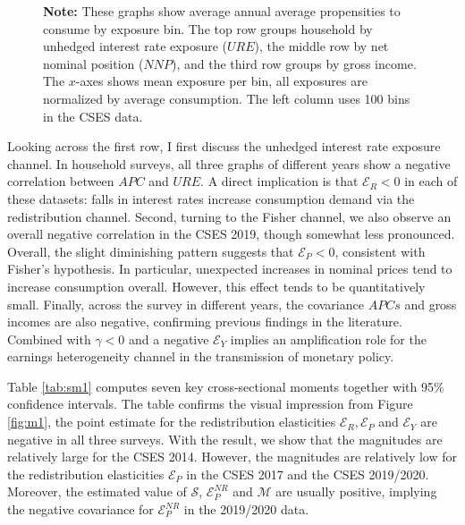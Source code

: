 \documentclass[11pt,letterpaper]{article}
\begin{document}
\begin{figure}
\begin{subfigure}[b]{0.33\linewidth}
	\newline {}
\end{subfigure}
\begin{tablenotes}
	\footnotesize
	\item \textbf{Note:} These graphs show average annual average propensities to consume by exposure bin. The top row groups household by unhedged interest rate exposure ($URE$), the middle row by net nominal position ($NNP$), and the third row groups by gross income. The $x$-axes shows mean exposure per bin, all exposures are normalized by average consumption. The left column uses 100 bins in the CSES data.    
\end{tablenotes} 


\end{figure}


Looking across the first row, I first discuss the unhedged interest rate exposure channel. In household surveys, all three graphs of different years show a negative correlation between $APC$ and $URE$. A direct implication is that $\mathcal{E}_{R} < 0$ in each of these datasets: falls in interest rates increase consumption demand via the redistribution channel. Second, turning to the Fisher channel, we also observe an overall negative correlation in the CSES 2019, though somewhat less pronounced. Overall, the slight diminishing pattern suggests that $\mathcal{E}_{P} < 0$, consistent with Fisher’s hypothesis. In particular, unexpected increases in nominal prices tend to increase consumption overall. However, this effect tends to be quantitatively small. Finally, across the survey in different years, the covariance $APCs$ and gross incomes are also negative, confirming previous findings in the literature. Combined with $\gamma <0$ and a negative $\mathcal{E}_{Y}$ implies an amplification role for the earnings heterogeneity channel in the transmission of monetary policy. 


Table \ref{tab:sm1} computes seven key cross-sectional moments together with 95\% confidence intervals. The table confirms the visual impression from Figure \ref{fig:m1}, the point estimate for the redistribution elasticities $\mathcal{E}_{R}, \mathcal{E}_{P}$ and $\mathcal{E}_{Y}$ are negative in all three surveys. With the result, we show that the magnitudes are relatively large for the CSES 2014. However, the magnitudes are relatively low for the redistribution elasticities $\mathcal{E}_{P}$ in the CSES 2017 and the CSES 2019/2020. Moreover, the estimated value of $\mathcal{S}$, $\mathcal{E}_{P}^{NR}$ and $\mathcal{M}$ are usually positive, implying the negative covariance for $\mathcal{E}_{P}^{NR}$ in the 2019/2020 data.
\end{document}
